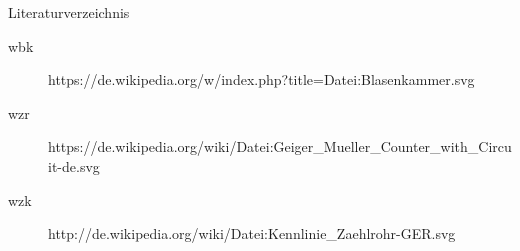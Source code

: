 \documentclass{beamer}
\begin{document}
\begin{frame}{Literaturverzeichnis}
	\begin{adjustwidth}{-5em}{-2em}
	  	\begin{description}
		  	\item[wbk]
		  	https://de.wikipedia.org/w/index.php?title=Datei:Blasenkammer.svg
		  	\item[wzr]
		  	https://de.wikipedia.org/wiki/Datei:Geiger\_Mueller\_Counter\_with\_Circuit-de.svg
		  	\item[wzk]
			http://de.wikipedia.org/wiki/Datei:Kennlinie_Zaehlrohr-GER.svg
		\end{description}
	\end{adjustwidth}  
\end{frame}
\end{document}
